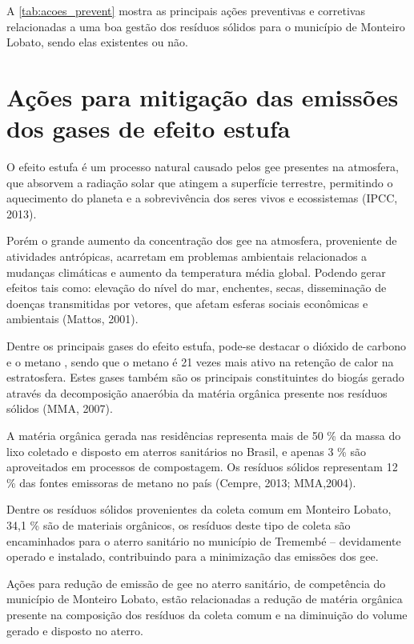 A \autoref{tab:acoes_prevent} mostra as principais ações preventivas e corretivas relacionadas a uma boa gestão dos resíduos sólidos para o município de Monteiro Lobato, sendo elas existentes ou não. 

		
		

\section{Ações para mitigação das emissões dos gases de efeito estufa}
O efeito estufa é um processo natural causado pelos \gls{gee} presentes na atmosfera, que absorvem a radiação solar que atingem a superfície terrestre, permitindo o aquecimento do planeta e a sobrevivência dos seres vivos e ecossistemas (IPCC, 2013). 	

Porém o grande aumento da concentração dos \gls{gee} na atmosfera, proveniente de atividades antrópicas, acarretam em problemas ambientais relacionados a mudanças climáticas e aumento da temperatura média global. Podendo gerar efeitos tais como: elevação do nível do mar, enchentes, secas, disseminação de doenças transmitidas por vetores, que afetam esferas sociais econômicas e ambientais (Mattos, 2001).

Dentre os principais gases do efeito estufa, pode-se destacar o dióxido de carbono  e o metano , sendo que o metano é 21 vezes mais ativo na retenção de calor na estratosfera. Estes gases também são os principais constituintes do biogás gerado através da decomposição anaeróbia da matéria orgânica presente nos resíduos sólidos (MMA, 2007).

A matéria orgânica gerada nas residências representa mais de 50 \% da massa do lixo coletado e disposto em aterros sanitários no Brasil, e apenas 3 \% são aproveitados em processos de compostagem. Os resíduos sólidos representam 12 \% das fontes emissoras de metano no país (Cempre, 2013; MMA,2004). 

Dentre os resíduos sólidos provenientes da coleta comum em Monteiro Lobato, 34,1 \% são de materiais orgânicos, os resíduos deste tipo de coleta são encaminhados para o aterro sanitário no município de Tremembé – devidamente operado e instalado, contribuindo para a minimização das emissões dos \gls{gee}. 

Ações para redução de emissão de \gls{gee} no aterro sanitário, de competência do município de Monteiro Lobato, estão relacionadas a redução de matéria orgânica presente na composição dos resíduos da coleta comum e na diminuição do volume gerado e disposto no aterro. 

